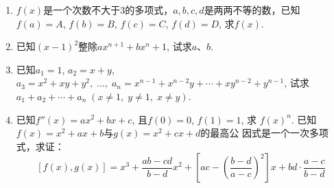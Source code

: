 \begin{enumerate}
\item $f(x)$是一个次数不大于3的多项式，$a,b,c,d$是两两不等的数，已知$f(a)=A$, $f(b)=B$, $f(c)=C$, $f(d)=D$, 求$f(x)$.
\item 已知$(x-1)^2$整除$ax^{n+1}+bx^n+1$, 试求$a$、$b$.
\item 已知$a_1=1$, $a_2=x+y$, $a_3=x^2+xy+y^2,\; \ldots,\; a_n=x^{n-1}+x^{n-2}y+\cdots +xy^{n-2}+y^{n-1}$, 试求$a_1+a_2+\cdots +a_n\; (x\ne 1,\; y\ne 1,\;x\ne y)$.
\item 已知$f''(x)=ax^2+bx+c$, 且$f(0)=0$, $f(1)=1$, 求
$f (x)^n$.
\staritem 已知$f(x)=x^2+ax+b$与$g(x)=x^2+cx+d$的最高公
因式是一个一次多项式，求证：
\[[f(x),g(x)]=x^3+\frac{ab-cd}{b-d}x^2+\left[ac-\left(\frac{b-d}{a-c}\right)^2\right]x+bd\cdot \frac{a-c}{b-d}\]
\end{enumerate}